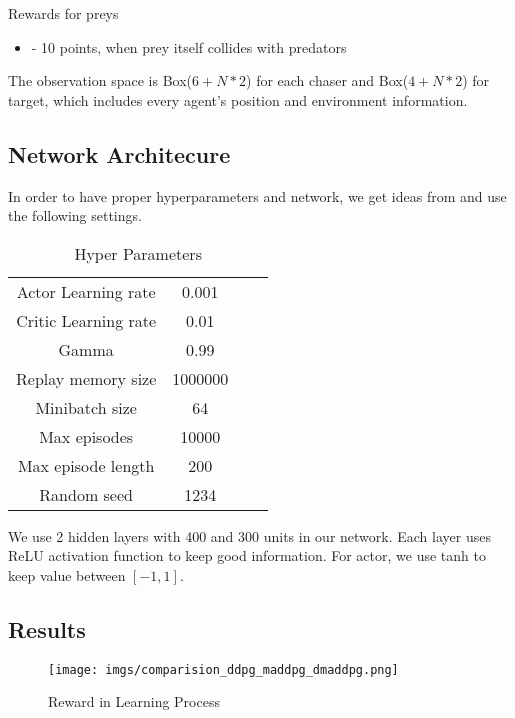 \documentclass[11pt,twocolumn]{jarticle} %
\begin{document}
Rewards for preys
\begin{itemize}
  \item - 10 points, when prey itself collides with predators
\end{itemize}

The observation space is Box($6+N*2$) for each chaser and Box($4+N*2$) for target, which includes every agent's position and environment information.



\subsection{Network Architecure}
In order to have proper hyperparameters and network, we get ideas from \cite{param} and use the following settings.

\begin{table}[ht]
 \caption{Hyper Parameters} 
 \label{tbl:hyperparameters}
  \begin{center}
    \begin{tabular}{c|ccc}
  \hline \hline
  Actor Learning rate  & 0.001   \\
  Critic Learning rate & 0.01    \\
  Gamma                & 0.99    \\
  Replay memory size   & 1000000 \\
  Minibatch size       & 64      \\
  Max episodes         & 10000   \\
  Max episode length   & 200     \\
  Random seed          & 1234    \\\hline
    \end{tabular}
  \end{center}
\end{table}

We use 2 hidden layers with 400 and 300 units in our network.
Each layer uses ReLU activation function to keep good information.
For actor, we use tanh to keep value between $[-1, 1]$. 

\subsection{Results}
\begin{figure*}[h]
 \begin{center}
  \texttt{[image: imgs/comparision\_ddpg\_maddpg\_dmaddpg.png]}
  \caption{Reward in Learning Process}
  \label{fig:tensor_result}
 \end{center}
\end{figure*}
\end{document}
